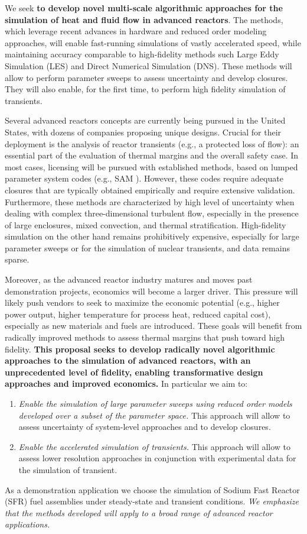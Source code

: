 We seek \textbf{to develop novel multi-scale algorithmic approaches for the
simulation of heat and fluid flow in advanced reactors}. The methods, which
leverage recent advances in hardware and reduced order modeling approaches,
will enable fast-running simulations of vastly accelerated speed, while
maintaining accuracy comparable to high-fidelity methods such Large Eddy
Simulation (LES) and Direct Numerical Simulation (DNS). These methods will
allow to perform
parameter sweeps to assess uncertainty and develop closures. They will also
enable, for the first time, to perform high fidelity simulation of transients.

Several  advanced reactors concepts are currently being pursued in the United
States, with dozens of companies proposing unique designs. Crucial for their
deployment is the analysis of  reactor transients (e.g., a protected loss of
flow): an essential part of the evaluation of thermal margins and the overall
safety case.  In most cases, licensing will be pursued with established
methods, based on lumped parameter system codes (e.g., SAM \cite{hu2021}).
However, these codes require adequate closures that are typically obtained
empirically and require extensive validation. Furthermore, these methods are
characterized by high level of uncertainty when dealing with complex
three-dimensional turbulent flow, especially in the presence of large
enclosures, mixed convection, and thermal stratification. High-fidelity
simulation on the other hand remains prohibitively expensive, especially for
large parameter sweeps or for the simulation of nuclear transients, and data
remains sparse.

Moreover, as the advanced reactor industry matures and moves past demonstration
projects, economics will become a larger driver. This pressure will likely push
vendors to seek to maximize the economic potential (e.g., higher power output,
higher temperature for process heat, reduced capital cost), especially as new
materials and fuels are introduced. These goals will benefit from radically
improved methods to assess thermal margins that push toward high fidelity.
\textbf{This proposal seeks to develop radically novel algorithmic approaches
to the simulation of advanced reactors, with an unprecedented level of
fidelity, enabling transformative design approaches and improved economics.} In
particular we aim to: 
\begin{enumerate}
%
   \item \textit{Enable the simulation of large parameter sweeps using reduced
   order models developed over a subset of the parameter space.} This approach
   will allow to assess uncertainty of system-level approaches and to develop
   closures.
%
   \item \textit{Enable the accelerated simulation of transients.}
   This approach will allow to assess lower resolution approaches in conjunction
   with experimental data for the simulation of transient.  
\end{enumerate}
As a demonstration application we choose the simulation of Sodium Fast Reactor
(SFR) fuel assemblies under steady-state and transient conditions. \textit{We
emphasize that the methods developed will apply to a broad range of advanced
reactor applications.}

